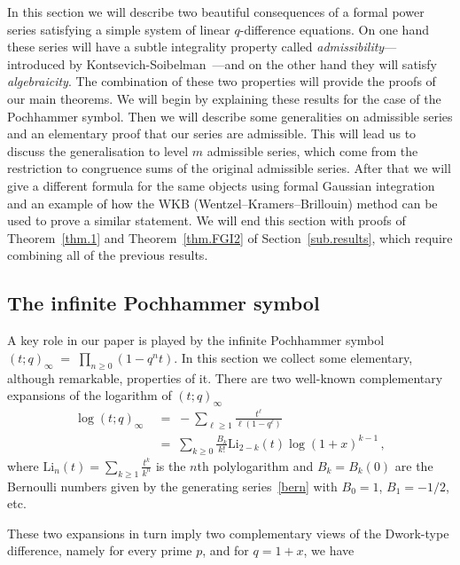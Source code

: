 \documentclass[12pt,reqno]{amsart}
\theoremstyle{definition}
\def\BQ{\mathbb Q}
\def\Li{\mathrm{Li}}
\def\={\;=\;}
\begin{document}
In this section we will describe two beautiful consequences of a formal power
series satisfying a simple system of linear $q$-difference equations. On one hand
these series will have a subtle integrality property called
\emph{admissibility}\thinspace---\thinspace introduced by
Kontsevich-Soibelman~\cite{KS:cohomological}\thinspace---\thinspace and on the other
hand they will satisfy \emph{algebraicity}. The combination of these two
properties will provide the proofs of our main theorems. We will begin by explaining
these results for the case of the Pochhammer symbol. Then we will describe some
generalities on admissible series and an elementary proof that our series are
admissible. This will lead us to discuss the generalisation to level $m$ admissible
series, which come from the restriction to congruence sums of the original
admissible series.
After that we will give a different formula for the same objects using
formal Gaussian integration and an example of how the WKB (Wentzel–Kramers–Brillouin)
method can be used to prove a similar statement. We will end this section with
proofs of Theorem~\ref{thm.1} and Theorem~\ref{thm.FGI2} of
Section~\ref{sub.results}, which require combining all of the previous results.

\subsection{The  infinite Pochhammer symbol}
\label{sub.poch}

A key role in our paper is played by the infinite Pochhammer symbol
$(t;q)_\infty \= \prod_{n \geq 0} (1-q^n t)$.
In this section we collect some elementary, although remarkable, properties of it. 
There are two well-known complementary expansions of the logarithm of $(t;q)_\infty$
\begin{align}
\label{logpoc}
\log (t;q)_\infty & \= -\sum_{\ell \geq 1} \frac{t^\ell}{\ell(1-q^\ell)}
\\
\label{logpoc2}
& \= \sum_{k \geq 0} \frac{B_k}{k!} \Li_{2-k}(t) \log(1+x)^{k-1}\,,
\end{align}
where $\Li_n(t)=\sum_{k \geq 1} \tfrac{t^k}{k^n}$ is the $n$th polylogarithm and
$B_k=B_{k}(0)$ are the Bernoulli numbers given by the generating series~\eqref{bern}
with $B_0=1$, $B_1=-1/2$, etc.

These two expansions in turn imply two complementary views
of the Dwork-type difference, namely for every prime $p$, and for $q=1+x$, we have
\end{document}
